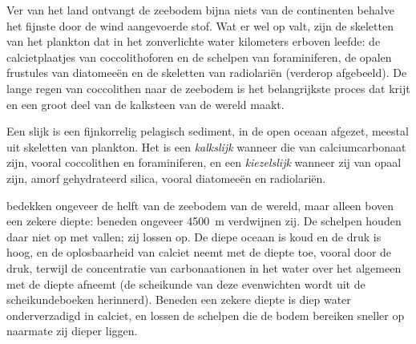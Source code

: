 Ver van het land ontvangt de zeebodem bijna niets van de continenten behalve het fijnste door de wind aangevoerde stof. Wat er wel op valt, zijn de skeletten van het plankton dat in het zonverlichte water kilometers erboven leefde: de calcietplaatjes van coccolithoforen en de schelpen van foraminiferen, de opalen frustules van diatomeeën en de skeletten van radiolariën (verderop afgebeeld). De lange regen van coccolithen naar de zeebodem is het belangrijkste proces dat krijt en een groot deel van de kalksteen van de wereld maakt.

\begin{definition}\label{def:b1:chemical-biogenic-sediments:ooze}
Een slijk is een fijnkorrelig pelagisch sediment, in de open oceaan afgezet, meestal uit
skeletten van plankton. Het is een \emph{kalkslijk} wanneer die van calciumcarbonaat zijn, vooral coccolithen en foraminiferen, en een \emph{kiezelslijk}
wanneer zij van opaal zijn, amorf gehydrateerd silica, vooral diatomeeën en radiolariën.
\end{definition}

 bedekken ongeveer de helft van de zeebodem van de wereld, maar alleen boven een zekere diepte: beneden ongeveer \qty{4500}{m} verdwijnen zij. De schelpen houden daar niet op met vallen; zij lossen op. De diepe oceaan is koud en de druk is hoog, en de oplosbaarheid van calciet neemt met de diepte toe, vooral door de druk, terwijl de concentratie van carbonaationen in het water over het algemeen met de diepte afneemt (de scheikunde van deze evenwichten wordt uit de scheikundeboeken herinnerd). Beneden een zekere diepte is diep water onderverzadigd in calciet, en lossen de schelpen die de bodem bereiken sneller op naarmate zij dieper liggen.

